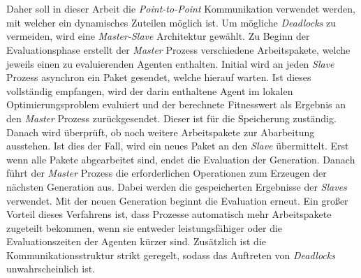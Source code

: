 \\\\
Daher soll in dieser Arbeit die \emph{Point-to-Point} Kommunikation verwendet werden, mit welcher ein dynamisches Zuteilen möglich ist. Um mögliche \emph{Deadlocks} zu vermeiden, wird eine \emph{Master-Slave} Architektur gewählt. Zu Beginn der Evaluationsphase erstellt der \emph{Master} Prozess verschiedene Arbeitspakete, welche jeweils einen zu evaluierenden Agenten enthalten. Initial wird an jeden \emph{Slave} Prozess asynchron ein Paket gesendet, welche hierauf warten. Ist dieses vollständig empfangen, wird der darin enthaltene Agent im lokalen Optimierungsproblem evaluiert und der berechnete Fitnesswert als Ergebnis an den \emph{Master} Prozess zurückgesendet. Dieser ist für die Speicherung zuständig. Danach wird überprüft, ob noch weitere Arbeitspakete zur Abarbeitung ausstehen. Ist dies der Fall, wird ein neues Paket an den \emph{Slave} übermittelt. Erst wenn alle Pakete abgearbeitet sind, endet die Evaluation der Generation. Danach führt der \emph{Master} Prozess die erforderlichen Operationen zum Erzeugen der nächsten Generation aus. Dabei werden die gespeicherten Ergebnisse der \emph{Slaves} verwendet. Mit der neuen Generation beginnt die Evaluation erneut. Ein großer Vorteil dieses Verfahrens ist, dass Prozesse automatisch mehr Arbeitspakete zugeteilt bekommen, wenn sie entweder leistungsfähiger oder die Evaluationszeiten der Agenten kürzer sind. Zusätzlich ist die Kommunikationsstruktur strikt geregelt, sodass das Auftreten von \emph{Deadlocks} unwahrscheinlich ist.
\\\\
